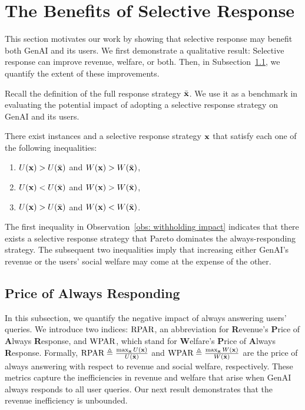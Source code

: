 \section{The Benefits of Selective Response} \label{sec: motivation}
This section motivates our work by showing that selective response may benefit both GenAI and its users. We first demonstrate a qualitative result: Selective response can improve revenue, welfare, or both. Then, in Subsection~\ref{sec: price of full response}, we quantify the extent of these improvements.


Recall the definition of the full response strategy $\Bar{{\bf{x}}}$. We use it as a benchmark in evaluating the potential impact of adopting a selective response strategy on GenAI and its users.
\begin{observation} \label{obs: withholding impact}
There exist instances and a selective response strategy ${\bf{x}}$ that satisfy each one of the following inequalities:
\begin{enumerate}
    \item $U({\bf{x}}) > U(\Bar{{\bf{x}}})$ and $W({\bf{x}}) > W(\Bar{{\bf{x}}})$,
    \item $U({\bf{x}}) < U(\Bar{{\bf{x}}})$ and $W({\bf{x}}) > W(\Bar{{\bf{x}}})$,
    \item $U({\bf{x}}) > U(\Bar{{\bf{x}}})$ and $W({\bf{x}}) < W(\Bar{{\bf{x}}})$.
\end{enumerate}
\end{observation}
The first inequality in Observation~\ref{obs: withholding impact} indicates that 
there exists a selective response strategy that Pareto dominates the always-responding strategy. The subsequent two inequalities imply that increasing either GenAI's revenue or the users' social welfare may come at the expense of the other.


\subsection{Price of Always Responding}\label{sec: price of full response}
In this subsection, we quantify the negative impact of always answering users' queries. We introduce two indices: $\textnormal{RPAR}$, an abbreviation for \textbf{R}evenue's \textbf{P}rice of \textbf{A}lways \textbf{R}esponse, and $\textnormal{WPAR}$, which stand for \textbf{W}elfare's \textbf{P}rice of \textbf{A}lways \textbf{R}esponse. Formally, $\textnormal{RPAR} \triangleq \frac{\max_{{\bf{x}}} U({\bf{x}})}{U(\Bar{{\bf{x}}})}$ and $\textnormal{WPAR} \triangleq \frac{\max_{{\bf{x}}} W({\bf{x}})}{W(\Bar{{\bf{x}}})}$ are the price of always answering with respect to revenue and social welfare, respectively. These metrics capture the inefficiencies in revenue and welfare that arise when GenAI always responds to all user queries. Our next result demonstrates that the revenue inefficiency is unbounded.

